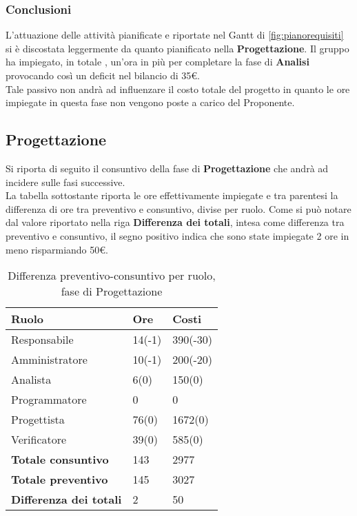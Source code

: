 \subsubsection{Conclusioni}
L'attuazione delle attività pianificate e riportate nel Gantt di \ref{fig:pianorequisiti} si è discostata leggermente da quanto pianificato nella \textbf{Progettazione}.
Il gruppo ha impiegato, in totale , un'ora in più per completare la fase di \textbf{Analisi} provocando così un deficit nel bilancio di 35\euro.\\
Tale passivo non andrà ad influenzare il costo totale del progetto in quanto le ore impiegate in questa fase non vengono poste a carico del Proponente.

\subsection{Progettazione}

Si riporta di seguito il consuntivo della fase di \textbf{Progettazione} che andrà ad incidere sulle fasi successive.\\
La tabella sottostante riporta le ore effettivamente impiegate e tra parentesi la differenza di ore tra preventivo e consuntivo, divise per ruolo. Come si può notare dal valore riportato nella riga \textbf{Differenza dei totali}, intesa come differenza tra preventivo e consuntivo, il segno positivo indica che sono state impiegate 2 ore in meno risparmiando 50\euro.

	\begin{table}[H]
		\centering
	  \begin{tabular}{p{}p{}
		    							p{}}
		   \toprule Ruolo & Ore & Costi \\
		   \midrule
		   Responsabile & 14(-1) & 390(-30) \\
		   Amministratore & 10(-1) & 200(-20) \\
		   Analista & 6(0) & 150(0) \\
		   Programmatore & 0 & 0 \\
		   Progettista & 76(0) & 1672(0) \\
		   Verificatore & 39(0) & 585(0) \\
		   \hline
		   \textbf{Totale consuntivo} & 143 & 2977 \\
		   \textbf{Totale preventivo} & 145 & 3027 \\
		   \textbf{Differenza dei totali} & 2 & 50 \\
		   \bottomrule
	 \end{tabular}
	 	\label{tab:costuntivoProgettazione}
	 	\caption{Differenza preventivo-consuntivo per ruolo, fase di Progettazione}
	\end{table}

